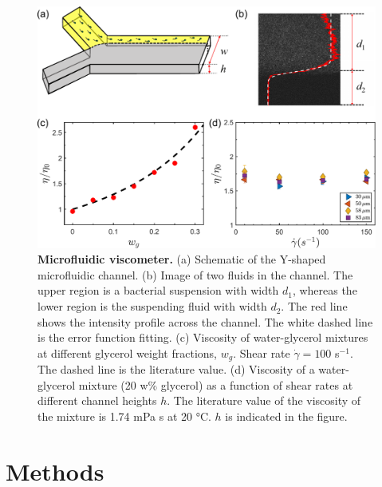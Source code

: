 \begin{figure}[!ht]
	\begin{center}
	\includegraphics[width=5.5 in]{Figs/3-Rheo/1.pdf}
	\end{center}
	\caption[Microfluidic Viscometer.]
	{
	\textbf{Microfluidic viscometer.}
  (a) Schematic of the Y-shaped microfluidic channel.
  (b) Image of two fluids in the channel. The upper region is a bacterial suspension with width $d_1$, whereas the lower region is the suspending fluid with width $d_2$. The red line shows the intensity profile across the channel. The white dashed line is the error function fitting.
  (c) Viscosity of water-glycerol mixtures at different glycerol weight
  fractions, $w_g$. Shear rate $\dot\gamma = 100$ s$^{-1}$. The dashed line is the literature value.
  (d) Viscosity of a water-glycerol mixture (20 w\% glycerol) as a function of shear rates at different channel heights $h$. The literature value of the viscosity of the mixture is 1.74 mPa s at 20 °C. $h$ is indicated in the figure.
	}
	\label{fig:3-viscometer}
\end{figure}

\section{Methods}
